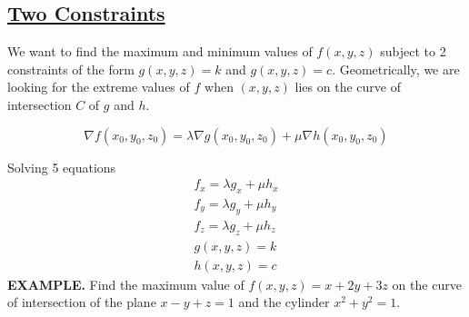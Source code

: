 \documentclass{article}
\begin{document}
\subsection*{{\selectfont \textcolor{blue5}{ \underline{Two Constraints}}}}
We want to find the maximum and minimum values of $f(x,y,z)$ subject to 2 constraints of the form $g(x,y,z) = k $ and $g(x,y,z) = c $. Geometrically, we are looking for the extreme values of $f$ when $(x,y,z)$ lies on the curve of intersection $C$ of $g$ and $h$. 
\begin{mdframed}
  \[\nabla f(x_0, y_0, z_0) = \lambda \nabla g(x_0, y_0, z_0) + \mu \nabla h (x_0, y_0, z_0 )\]
\end{mdframed}
Solving 5 equations 
\begin{equation*}
  \begin{split}
    f_x  = \lambda g_x + \mu h_x \\
    f_y  = \lambda g_y + \mu h_y \\
    f_z  = \lambda g_z + \mu h_z \\
    g(x,y,z) = k \\
    h(x,y,z) = c
  \end{split}
\end{equation*}
{\selectfont \textbf{\textcolor{blue5}{ EXAMPLE.}}} Find the maximum value of $f(x,y,z) = x + 2y + 3z$ on the curve of intersection  of the plane $x - y + z = 1 $ and the cylinder $x^2 + y^2 = 1 $.
\end{document}
